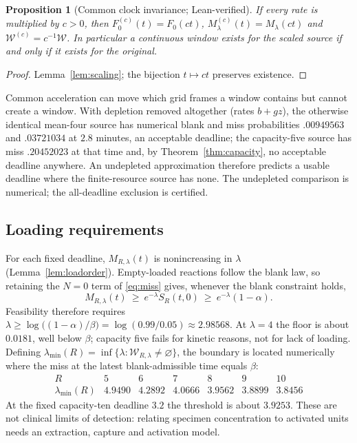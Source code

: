 \documentclass[11pt,a4paper]{article}
\theoremstyle{plain}
\newtheorem{proposition}[theorem]{Proposition}
\theoremstyle{definition}
\theoremstyle{remark}
\newcommand{\Wc}{\mathcal W}
\begin{document}
\begin{proposition}[Common clock invariance; Lean-verified]\label{prop:clock}
If every rate is multiplied by $c>0$, then $F_0^{(c)}(t)=F_0(ct)$, $M_\lambda^{(c)}(t)=M_\lambda(ct)$ and $\Wc^{(c)}=c^{-1}\Wc$. In particular a continuous window exists for the scaled source if and only if it exists for the original.
\end{proposition}
\begin{proof}
Lemma~\ref{lem:scaling}; the bijection $t\mapsto ct$ preserves existence.
\end{proof}
Common acceleration can move which grid frames a window contains but cannot create a window. With depletion removed altogether (rates $b+gz$), the otherwise identical mean-four source has numerical blank and miss probabilities $.00949563$ and $.03721034$ at $2.8$ minutes, an acceptable deadline; the capacity-five source has miss $.20452023$ at that time and, by Theorem~\ref{thm:capacity}, no acceptable deadline anywhere. An undepleted approximation therefore predicts a usable deadline where the finite-resource source has none. The undepleted comparison is numerical; the all-deadline exclusion is certified.

\subsection{Loading requirements}
For each fixed deadline, $M_{R,\lambda}(t)$ is nonincreasing in $\lambda$ (Lemma~\ref{lem:loadorder}). Empty-loaded reactions follow the blank law, so retaining the $N=0$ term of \eqref{eq:miss} gives, whenever the blank constraint holds,
\begin{equation}\label{eq:floor}
M_{R,\lambda}(t)\ \ge\ e^{-\lambda}S_R(t,0)\ \ge\ e^{-\lambda}(1-\alpha).
\end{equation}
Feasibility therefore requires $\lambda\ge\log\bigl((1-\alpha)/\beta\bigr)=\log(0.99/0.05)\approx2.98568$. At $\lambda=4$ the floor is about $0.0181$, well below $\beta$; capacity five fails for kinetic reasons, not for lack of loading. Defining $\lambda_{\min}(R)=\inf\{\lambda:\Wc_{R,\lambda}\ne\varnothing\}$, the boundary is located numerically where the miss at the latest blank-admissible time equals $\beta$:
\[
\begin{array}{c|cccccc}
R&5&6&7&8&9&10\\\hline
\lambda_{\min}(R)&4.9490&4.2892&4.0666&3.9562&3.8899&3.8456
\end{array}
\]
At the fixed capacity-ten deadline $3.2$ the threshold is about $3.9253$. These are not clinical limits of detection: relating specimen concentration to activated units needs an extraction, capture and activation model.
\end{document}
